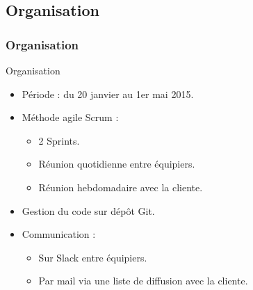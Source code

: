 \subsection{Organisation}
\begin{frame}
    \frametitle{\color{white}Organisation}
  \begin{block}{Organisation}
    \begin{itemize}
     \item Période : du 20 janvier au 1er mai 2015.
     \item Méthode agile Scrum :
     \begin{itemize}
       \item 2 Sprints.
       \item Réunion quotidienne entre équipiers.
       \item Réunion hebdomadaire avec la cliente.
      \end{itemize}
     \item Gestion du code sur dépôt Git.
     \item Communication :
      \begin{itemize}
       \item Sur Slack entre équipiers.
       \item Par mail via une liste de diffusion avec la cliente.
      \end{itemize}

    \end{itemize}
  \end{block}
\end{frame}